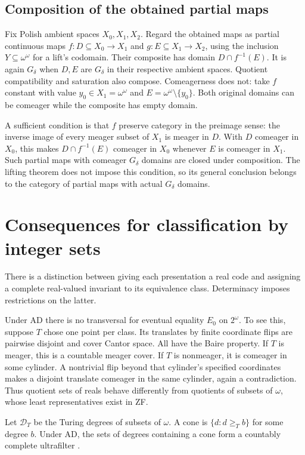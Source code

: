 \documentclass[11pt]{article}
\theoremstyle{definition}
\newcommand{\N}{\omega}
\newcommand{\B}{\omega^\omega}
\begin{document}
\subsection{Composition of the obtained partial maps}

Fix Polish ambient spaces $X_0,X_1,X_2$. Regard the obtained maps
as partial continuous maps $f:D\subseteq X_0\to X_1$ and
$g:E\subseteq X_1\to X_2$, using the inclusion $Y\subseteq\B$
for a lift's codomain. Their composite has domain
$D\cap f^{-1}(E)$. It is again $G_\delta$ when $D,E$ are
$G_\delta$ in their respective ambient spaces. Quotient compatibility
and saturation also compose. Comeagerness does not: take $f$ constant
with value $y_0\in X_1=\B$ and
$E=\B\setminus\{y_0\}$. Both original domains can be
comeager while the composite has empty domain.

A sufficient condition is that $f$ preserve category in the
preimage sense: the inverse image of every meager subset of $X_1$
is meager in $D$. With $D$ comeager in $X_0$, this makes
$D\cap f^{-1}(E)$ comeager in $X_0$ whenever $E$ is comeager
in $X_1$. Such partial maps with comeager $G_\delta$ domains
are closed under composition. The lifting theorem does not impose
this condition, so its general conclusion belongs to the category
of partial maps with actual $G_\delta$ domains.

\section{Consequences for classification by integer sets}\label{sec:classification}

There is a distinction between giving each presentation a real code
and assigning a complete real-valued invariant to its equivalence
class. Determinacy imposes restrictions on the latter.

Under AD there is no transversal for eventual equality $E_0$ on
$2^\N$. To see this, suppose $T$ chose one point per class.
Its translates by finite coordinate flips are pairwise disjoint and
cover Cantor space. All have the Baire property. If $T$ is meager,
this is a countable meager cover. If $T$ is nonmeager, it is
comeager in some cylinder. A nontrivial flip beyond that cylinder's
specified coordinates makes a disjoint translate comeager in the
same cylinder, again a contradiction. Thus quotient sets of reals
behave differently from quotients of subsets of $\N$, whose least
representatives exist in ZF.

Let $\mathcal D_T$ be the Turing degrees of subsets of $\N$.
A cone is $\{d:d\geq_T b\}$ for some degree $b$. Under AD,
the sets of degrees containing a cone form a countably complete
ultrafilter \cite[Theorems 2.8--2.9]{KoellnerWoodin}.
\end{document}
